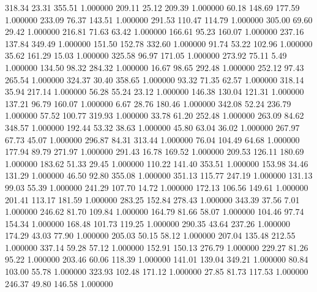     318.34     23.31    355.51  1.000000
    209.11     25.12    209.39  1.000000
     60.18    148.69    177.59  1.000000
    233.09     76.37    143.51  1.000000
    291.53    110.47    114.79  1.000000
    305.00     69.60     29.42  1.000000
    216.81     71.63     63.42  1.000000
    166.61     95.23    160.07  1.000000
    237.16    137.84    349.49  1.000000
    151.50    152.78    332.60  1.000000
     91.74     53.22    102.96  1.000000
     35.62    161.29     15.03  1.000000
    325.58     96.97    171.05  1.000000
    273.92     75.11      5.49  1.000000
    134.50     98.32    284.32  1.000000
     16.67     98.65    292.48  1.000000
    252.12     97.43    265.54  1.000000
    324.37     30.40    358.65  1.000000
     93.32     71.35     62.57  1.000000
    318.14     35.94    217.14  1.000000
     56.28     55.24     23.12  1.000000
    146.38    130.04    121.31  1.000000
    137.21     96.79    160.07  1.000000
      6.67     28.76    180.46  1.000000
    342.08     52.24    236.79  1.000000
     57.52    100.77    319.93  1.000000
     33.78     61.20    252.48  1.000000
    263.09     84.62    348.57  1.000000
    192.44     53.32     38.63  1.000000
     45.80     63.04     36.02  1.000000
    267.97     67.73     45.07  1.000000
    296.87     84.31    313.44  1.000000
     76.04    104.49     64.68  1.000000
    177.94     89.79    271.97  1.000000
    291.43     16.78    169.52  1.000000
    209.53    126.11    180.69  1.000000
    183.62     51.33     29.45  1.000000
    110.22    141.40    353.51  1.000000
    153.98     34.46    131.29  1.000000
     46.50     92.80    355.08  1.000000
    351.13    115.77    247.19  1.000000
    131.13     99.03     55.39  1.000000
    241.29    107.70     14.72  1.000000
    172.13    106.56    149.61  1.000000
    201.41    113.17    181.59  1.000000
    283.25    152.84    278.43  1.000000
    343.39     37.56      7.01  1.000000
    246.62     81.70    109.84  1.000000
    164.79     81.66     58.07  1.000000
    104.46     97.74    154.34  1.000000
    168.48    101.73    119.25  1.000000
    290.35     43.64    237.26  1.000000
    174.29     43.03     77.90  1.000000
    205.03     50.15     58.12  1.000000
    207.04    135.48    212.55  1.000000
    337.14     59.28     57.12  1.000000
    152.91    150.13    276.79  1.000000
    229.27     81.26     95.22  1.000000
    203.46     60.06    118.39  1.000000
    141.01    139.04    349.21  1.000000
     80.84    103.00     55.78  1.000000
    323.93    102.48    171.12  1.000000
     27.85     81.73    117.53  1.000000
    246.37     49.80    146.58  1.000000
